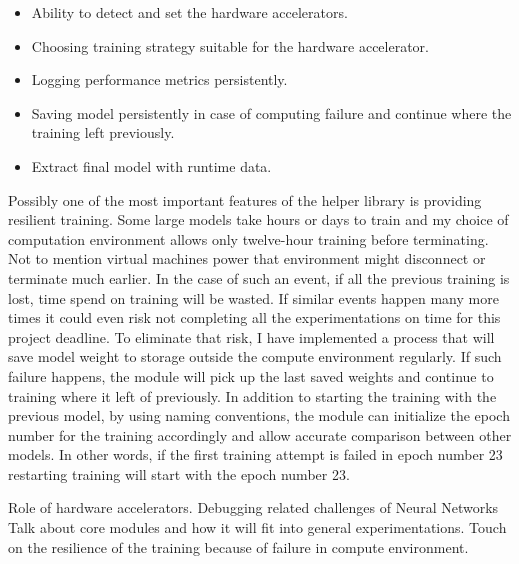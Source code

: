 \begin{itemize}
  \item Ability to detect and set the hardware accelerators.
  \item Choosing training strategy suitable for the hardware accelerator.
  \item Logging performance metrics persistently.
  \item Saving model persistently in case of computing failure and continue where the training left previously.
  \item Extract final model with runtime data.
\end{itemize}
 
Possibly one of the most important features of the helper library is providing resilient training. 
Some large models take hours or days to train and my choice of computation environment allows only twelve-hour training before terminating. 
Not to mention virtual machines power that environment might disconnect or terminate much earlier. 
In the case of such an event, if all the previous training is lost, time spend on training will be wasted. 
If similar events happen many more times it could even risk not completing all the experimentations on time for this project deadline. 
To eliminate that risk, I have implemented a process that will save model weight to storage outside the compute environment regularly. 
If such failure happens, the module will pick up the last saved weights and continue to training where it left of previously.
In addition to starting the training with the previous model, by using naming conventions, the module can initialize the epoch number for the training accordingly and allow accurate comparison between other models. 
In other words, if the first training attempt is failed in epoch number 23 restarting training will start with the epoch number 23.




Role of hardware accelerators. Debugging related challenges of Neural Networks
Talk about core modules and how it will fit into general experimentations. 
Touch on the resilience of the training because of failure in compute environment.
\clearpage